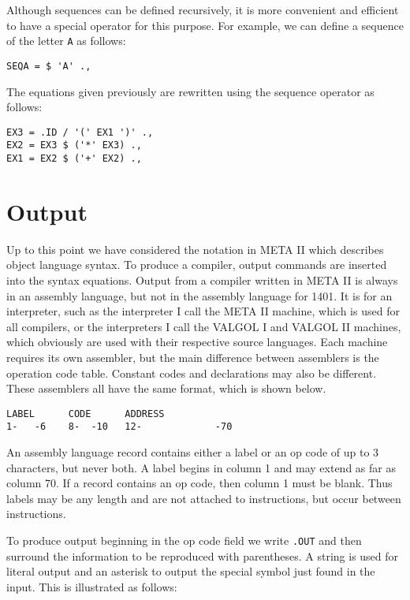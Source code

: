 \documentclass[notitlepage,twocolumn]{report}
\begin{document}
Although sequences can be defined recursively, it is more convenient
and efficient to have a special operator for this purpose. For
example, we can define a sequence of the letter \texttt{A} as follows:

\begin{verbatim}
SEQA = $ 'A' .,
\end{verbatim}

The equations given previously are rewritten using the sequence
operator as follows:

\begin{verbatim}
EX3 = .ID / '(' EX1 ')' .,
EX2 = EX3 $ ('*' EX3) .,
EX1 = EX2 $ ('+' EX2) .,
\end{verbatim}


\section*{Output}

Up to this point we have considered the notation in META II which
describes object language syntax. To produce a compiler, output
commands are inserted into the syntax equations. Output from a
compiler written in META II is always in an assembly language, but not
in the assembly language for 1401. It is for an interpreter, such as
the interpreter I call the META II machine, which is used for all
compilers, or the interpreters I call the VALGOL I and VALGOL II
machines, which obviously are used with their respective source
languages. Each machine requires its own assembler, but the main
difference between assemblers is the operation code table. Constant
codes and declarations may also be different. These assemblers all
have the same format, which is shown below.

\begin{verbatim}
LABEL      CODE      ADDRESS
1-   -6    8-  -10   12-             -70
\end{verbatim}

An assembly language record contains either a label or an op code of
up to 3 characters, but never both. A label begins in column 1 and may
extend as far as column 70. If a record contains an op code, then
column 1 must be blank. Thus labels may be any length and are not
attached to instructions, but occur between instructions.

To produce output beginning in the op code field we write
\texttt{.OUT} and then surround the information to be reproduced with
parentheses. A string is used for literal output and an asterisk to
output the special symbol just found in the input. This is illustrated
as follows:
\end{document}
